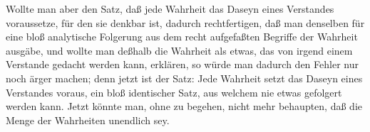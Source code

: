 \begin{RWanm}
\begin{aufza}
\item Wollte man aber den Satz, daß jede Wahrheit das Daseyn eines Verstandes voraussetze, für den sie denkbar ist, dadurch rechtfertigen, daß man denselben für eine bloß analytische Folgerung aus dem recht aufgefaßten Begriffe der Wahrheit ausgäbe, und wollte man deßhalb die Wahrheit als etwas, das von irgend einem Verstande gedacht werden kann, erklären, so würde man dadurch den Fehler nur noch ärger machen; denn jetzt ist der Satz: Jede Wahrheit setzt das Daseyn eines Verstandes voraus, ein bloß identischer Satz, aus welchem nie etwas gefolgert werden kann. Jetzt könnte man, ohne  zu begehen, nicht mehr behaupten, daß die Menge der Wahrheiten unendlich sey.
\end{aufza}
\end{RWanm}

